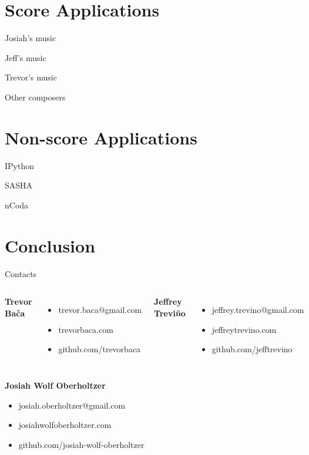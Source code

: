 \documentclass[10pt]{beamer}
\begin{document}
\section{Score Applications}

\begin{frame}{Josiah's music}
\end{frame}

\begin{frame}{Jeff's music}
\end{frame}

\begin{frame}{Trevor's music}
\end{frame}

\begin{frame}{Other composers}
\end{frame}

\section{Non-score Applications}

\begin{frame}{IPython}
\end{frame}

\begin{frame}{SASHA}
\end{frame}

\begin{frame}{nCoda}
\end{frame}

\section{Conclusion}

\begin{frame}{Contacts}
    \begin{columns}[t,onlytextwidth]
        \textbf{Trevor Ba\v{c}a}
        \begin{itemize}
            \item trevor.baca@gmail.com
            \item trevorbaca.com
            \item github.com/trevorbaca
        \end{itemize}
        \textbf{Jeffrey Trevi\~{n}o}
        \begin{itemize}
            \item jeffrey.trevino@gmail.com
            \item jeffreytrevino.com
            \item github.com/jefftrevino
        \end{itemize}
    \end{columns}
    \vspace{\baselineskip}
    \textbf{Josiah Wolf Oberholtzer}
    \begin{itemize}
        \item josiah.oberholtzer@gmail.com
        \item josiahwolfoberholtzer.com
        \item github.com/josiah-wolf-oberholtzer
    \end{itemize}
\end{frame}
\end{document}
